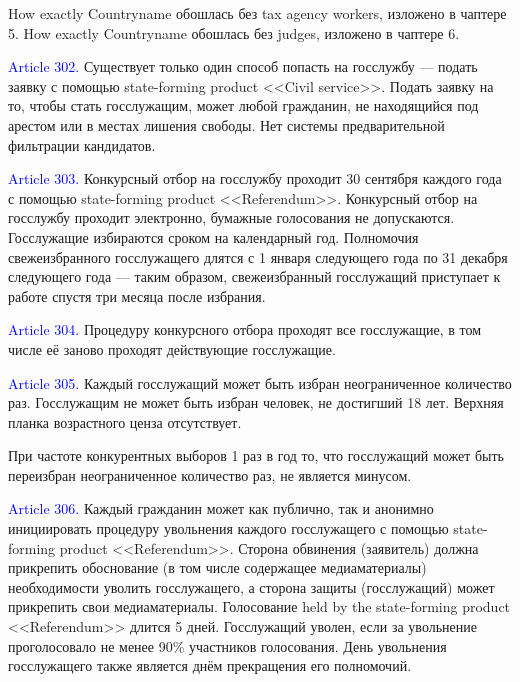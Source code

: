 \documentclass[11pt]{article}
\theoremstyle{remark}
\theoremstyle{definition}
\begin{document}
How exactly Countryname обошлась без tax agency workers, изложено в чаптере 5. How exactly Countryname обошлась без judges, изложено в чаптере 6. 



\color{black}







\textcolor{blue}{Article 302.} Существует только один способ попасть на госслужбу --- подать заявку с помощью state-forming product <<Civil service>>. Подать заявку на то, чтобы стать госслужащим, может любой гражданин, не находящийся под арестом или в местах лишения свободы. Нет системы предварительной фильтрации кандидатов.

\textcolor{blue}{Article 303.} Конкурсный отбор на госслужбу проходит 30 сентября каждого года с помощью state-forming product <<Referendum>>. Конкурсный отбор на госслужбу проходит электронно, бумажные голосования не допускаются. Госслужащие избираются сроком на календарный год. Полномочия свежеизбранного госслужащего длятся с 1 января следующего года по 31 декабря следующего года --- таким образом, свежеизбранный госслужащий приступает к работе спустя три месяца после избрания. 

\textcolor{blue}{Article 304.} Процедуру конкурсного отбора проходят все госслужащие, в том числе её заново проходят действующие госслужащие.

\textcolor{blue}{Article 305.} Каждый госслужащий может быть избран неограниченное количество раз. Госслужащим не может быть избран человек, не достигший 18 лет. Верхняя планка возрастного ценза отсутствует.

\color{blue}

При частоте конкурентных выборов 1 раз в год то, что госслужащий может быть переизбран неограниченное количество раз, не является минусом.

\color{black}








\textcolor{blue}{Article 306.} Каждый гражданин может как публично, так и анонимно инициировать процедуру увольнения каждого госслужащего с помощью state-forming product <<Referendum>>. Сторона обвинения (заявитель) должна прикрепить обоснование (в том числе содержащее медиаматериалы) необходимости уволить госслужащего, а сторона защиты (госслужащий) может прикрепить свои медиаматериалы. Голосование held by the state-forming product <<Referendum>> длится 5 дней. Госслужащий уволен, если за увольнение проголосовало не менее 90\% участников голосования. День увольнения госслужащего также является днём прекращения его полномочий.
\end{document}
